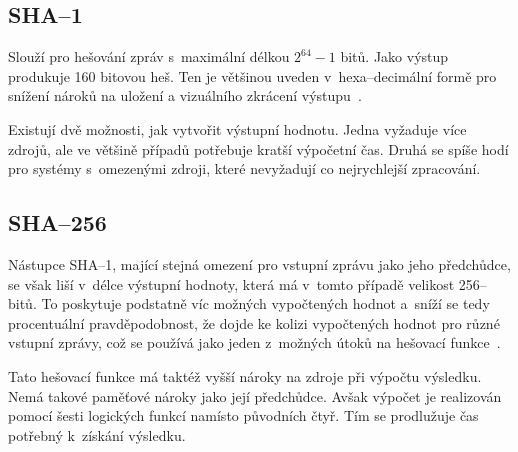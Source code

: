 \subsection{SHA--1}
Slouží pro hešování zpráv s~maximální délkou $2^{64}-1$ bitů. Jako výstup produkuje 160 bitovou
heš. Ten je většinou uveden v~hexa--decimální formě pro snížení nároků na uložení
a vizuálního zkrácení výstupu~\cite{NIST:2015}. 

Existují dvě možnosti, jak vytvořit výstupní hodnotu. Jedna vyžaduje více zdrojů, ale ve většině
případů potřebuje kratší výpočetní čas. Druhá se spíše hodí
pro systémy s~omezenými zdroji, které nevyžadují co nejrychlejší zpracování.


\subsection{SHA--256}
Nástupce SHA--1, mající stejná omezení pro vstupní zprávu jako jeho předchůdce, se však liší v~délce
výstupní hodnoty, která má v~tomto případě velikost 256--bitů. To poskytuje podstatně víc možných
vypočtených hodnot a~sníží se tedy procentuální pravděpodobnost, že dojde ke kolizi vypočtených
hodnot pro různé vstupní zprávy, což se používá jako jeden z~možných útoků na hešovací
funkce~\cite{NIST:2015}.

Tato hešovací funkce má taktéž vyšší nároky na zdroje při výpočtu výsledku. Nemá takové paměťové
nároky jako její předchůdce. Avšak výpočet je realizován pomocí šesti logických funkcí namísto
původních čtyř. Tím se prodlužuje čas potřebný k~získání výsledku.


